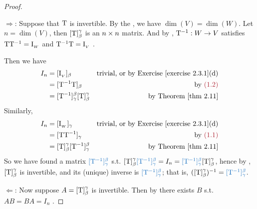 \begin{proof} \ 

\(\Longrightarrow\): Suppose that \(\mathrm{T}\) is invertible.
By the , we have \(\dim(V) = \dim(W)\).
Let \(n = \dim(V)\), then \([\mathrm{T}]_{\beta}^{\gamma}\) is an \(n \times n\) matrix.
And by , \(\mathrm{T}^{-1} : W \to V\) satisfies \(\mathrm{T}\mathrm{T}^{-1} = \mathrm{I}_{_W}\)  and \(\mathrm{T}^{-1}\mathrm{T} = \mathrm{I}_{_V}\) .

Then we have
\begin{align*}
    I_n & = [\ITRANV]_{\beta} & \text{trivial, or by \EXEC{2.3.1}(d)} \\
        & = [\T^{-1}\T]_{\beta} & \text{by \MAROON{(1.2)}} \\
        & = [\T^{-1}]_{\gamma}^{\beta} [\T]_{\beta}^{\gamma} & \text{by \THM{2.11}}
\end{align*}
Similarly,
\begin{align*}
    I_n & = [\ITRANW]_{\gamma} & \text{trivial, or by \EXEC{2.3.1}(d)} \\
        & = [\T\T^{-1}]_{\gamma} & \text{by \MAROON{(1.1)}} \\
        & = [\T]_{\beta}^{\gamma} [\T^{-1}]_{\gamma}^{\beta} & \text{by \THM{2.11}}
\end{align*}
So we have found a matrix \( \BLUE{[\T^{-1}]_{\gamma}^{\beta}}\) s.t. \([\T]_{\beta}^{\gamma} \BLUE{[\T^{-1}]_{\gamma}^{\beta}} = I_n = \BLUE{[\T^{-1}]_{\gamma}^{\beta}} [\T]_{\beta}^{\gamma}\),
hence by , \([\mathrm{T}]_{\beta}^{\gamma}\) is invertible, and its (unique) inverse is \(\BLUE{[\T^{-1}]_{\gamma}^{\beta}}\);
that is, \(([\T]_{\beta}^{\gamma})^{-1} = \BLUE{[\T^{-1}]_{\gamma}^{\beta}}\).

\(\Longleftarrow\): Now suppose \(A = [\mathrm{T}]_{\beta}^{\gamma}\)  is invertible.
Then by  there exists \(B\) s.t. \(AB = BA = I_n\) .


\end{proof}
